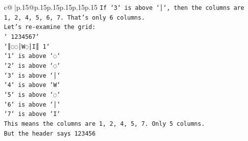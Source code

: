 \documentclass{article}
\begin{document}
{\begin{supertabular}{c@{$\;$}|p{.15\linewidth}@{}p{.15\linewidth}p{.15\linewidth}p{.15\linewidth}p{.15\linewidth}p{.15\linewidth}}
{{{\texttt{If `3` is above `│`, then the columns are 1, 2, 4, 5, 6, 7. That's only 6 columns.} \\
\texttt{Let's re{-}examine the grid:} \\
\texttt{` 1234567`} \\
\texttt{`║◌◌│W◌│I║ 1`} \\
\texttt{`1` is above `◌`} \\
\texttt{`2` is above `◌`} \\
\texttt{`3` is above `│`} \\
\texttt{`4` is above `W`} \\
\texttt{`5` is above `◌`} \\
\texttt{`6` is above `│`} \\
\texttt{`7` is above `I`} \\
\texttt{This means the columns are 1, 2, 4, 5, 7. Only 5 columns.} \\
\texttt{But the header says 123456} \\
            }
        }
    }
     \\ \\


\end{supertabular}}
\end{document}
